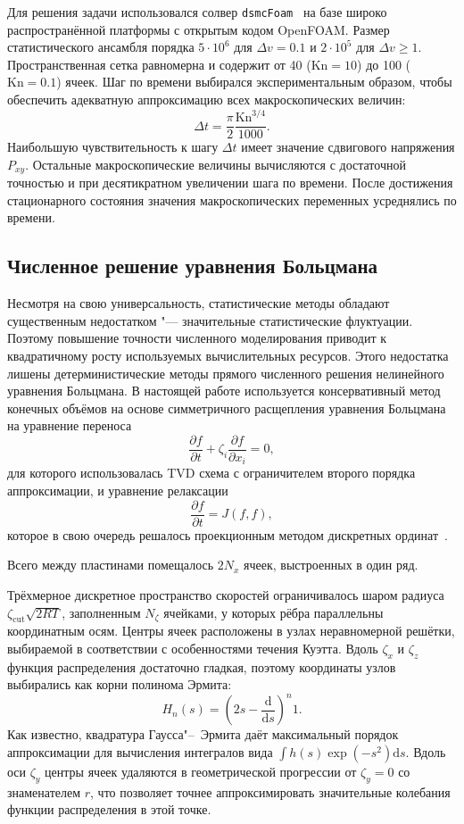 \documentclass[a4paper,12pt]{article}
\newcommand{\Kn}{\mathrm{Kn}}
\newcommand{\dd}{\mathrm{d}}
\newcommand{\pder}[2][]{\frac{\partial#1}{\partial#2}}
\begin{document}
Для решения задачи использовался солвер \verb+dsmcFoam+~\cite{dsmcFoam2010}
на базе широко распространённой платформы с открытым кодом OpenFOAM\textregistered{}.
Размер статистического ансамбля порядка \(5\cdot10^6\) для \(\Delta{v}=0.1\)
и \(2\cdot10^5\) для \(\Delta{v}\ge1\).
Пространственная сетка равномерна и содержит от 40 (\(\Kn=10\)) до 100 (\(\Kn=0.1\)) ячеек.
Шаг по времени выбирался экспериментальным образом,
чтобы обеспечить адекватную аппроксимацию всех макроскопических величин:
\begin{equation}\label{eq:dsmc_timestep}
    \Delta{t} = \frac\pi2 \frac{\Kn^{3/4}}{1000}.
\end{equation}
Наибольшую чувствительность к шагу \(\Delta{t}\) имеет значение сдвигового напряжения \(P_{xy}\).
Остальные макроскопические величины вычисляются с достаточной точностью и при десятикратном увеличении шага по времени.
После достижения стационарного состояния значения макроскопических переменных усреднялись по времени.

\subsection{Численное решение уравнения Больцмана}

Несмотря на свою универсальность, статистические методы обладают существенным недостатком
"--- значительные статистические флуктуации. Поэтому повышение точности численного моделирования
приводит к квадратичному росту используемых вычислительных ресурсов.
Этого недостатка лишены детерминистические методы прямого численного решения нелинейного уравнения Больцмана.
В настоящей работе используется консервативный метод конечных объёмов на основе
симметричного расщепления уравнения Больцмана на уравнение переноса
\[ \pder[f]{t} + \zeta_i\pder[f]{x_i} = 0, \]
для которого использовалась TVD схема с ограничителем второго порядка аппроксимации,
и уравнение релаксации
\[ \pder[f]{t} = J(f,f), \]
которое в свою очередь решалось проекционным методом дискретных ординат~\cite{Tcheremissine2006}.

Всего между пластинами помещалось \(2N_x\) ячеек, выстроенных в один ряд.

Трёхмерное дискретное пространство скоростей ограничивалось шаром радиуса \(\zeta_\mathrm{cut}\sqrt{2RT}\),
заполненным \(N_\zeta\) ячейками, у которых рёбра параллельны координатным осям.
Центры ячеек расположены в узлах неравномерной решётки,
выбираемой в соответствии с особенностями течения Куэтта.
Вдоль \(\zeta_x\) и \(\zeta_z\) функция распределения достаточно гладкая,
поэтому координаты узлов выбирались как корни полинома Эрмита:
\begin{equation}
    H_n(s) = \left(2s-\frac{\dd}{\dd s}\right)^n 1.
\end{equation}
Как известно, квадратура Гаусса"--~Эрмита даёт максимальный порядок аппроксимации
для вычисления интегралов вида \(\int h(s)\exp(-s^2)\dd{s}\).
Вдоль оси \(\zeta_y\) центры ячеек удаляются в геометрической прогрессии от \(\zeta_y=0\)
со знаменателем \(r\), что позволяет точнее аппроксимировать значительные колебания функции распределения в этой точке.
\end{document}
